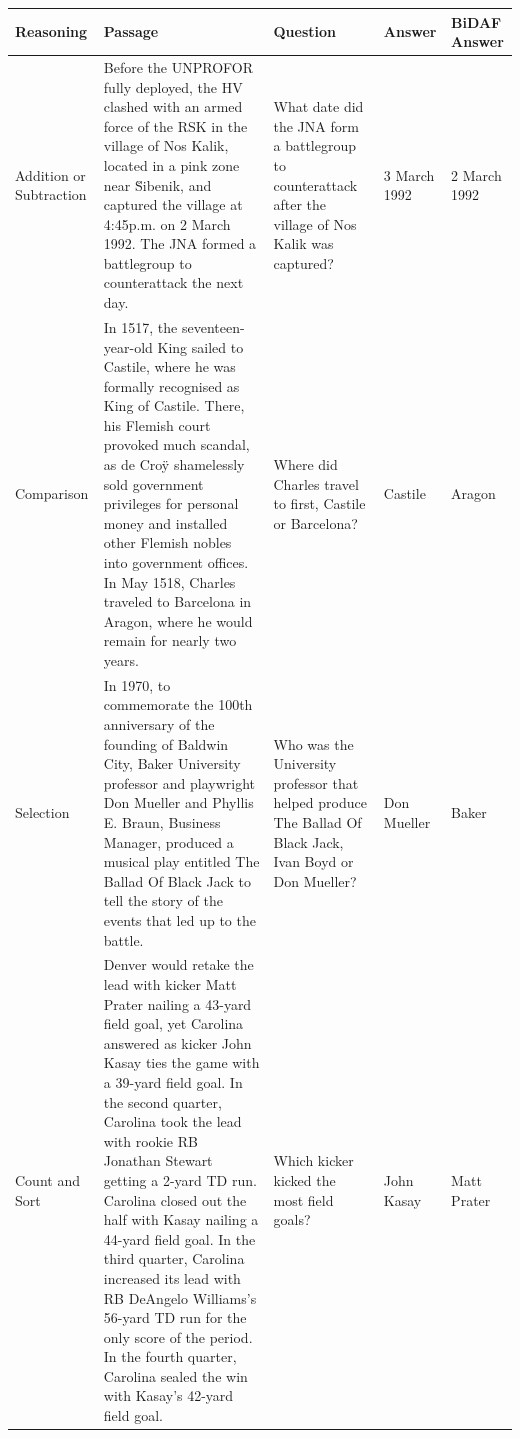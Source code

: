 \begin{table}[t]
\centering
\footnotesize
\begin{tabular}{|p{1.5cm}|p{8cm}|p{3cm}|p{1.25cm}|p{1.25cm}|}
\hline
Reasoning & Passage & Question & Answer & BiDAF Answer\\
 \hline
 Addition or Subtraction & Before the UNPROFOR fully deployed, the HV clashed with an armed force of the RSK in the village of Nos Kalik, located in a pink zone near \u Sibenik, and captured the village at 4:45p.m. on {\color{teal}2 March 1992}. The JNA formed a battlegroup to counterattack the {\color{teal}next day}. & What date did the JNA form a battlegroup to counterattack after the village of Nos Kalik was captured?  & 3 March 1992 & 2 March 1992 \\ 
 \hline
 Comparison & In {\color{orange}1517, the seventeen-year-old King sailed to Castile}, where he was formally recognised as King of Castile. There, his Flemish court provoked much scandal, as de Cro\"y shamelessly sold government privileges for personal money and installed other Flemish nobles into government offices. {\color{orange}In May 1518, Charles traveled to Barcelona in Aragon}, where he would remain for nearly two years. & Where did Charles travel to first, Castile or Barcelona? & Castile & Aragon\\
 \hline
 Selection & In 1970, to commemorate the 100th anniversary of the founding of Baldwin City, {\color{purple}Baker University professor and playwright Don Mueller and Phyllis E. Braun, Business Manager, produced a musical play entitled The Ballad Of Black Jack} to tell the story of the events that led up to the battle. & Who was the University professor that helped produce The Ballad Of Black Jack, Ivan Boyd or Don Mueller? & Don Mueller & Baker\\
 \hline
 Count and Sort & Denver would retake the lead with kicker {\color{brown}Matt Prater nailing a 43-yard field goal}, yet Carolina answered as kicker {\color{brown}John Kasay ties the game with a 39-yard field goal}. In the second quarter, Carolina took the lead with rookie RB Jonathan Stewart getting a 2-yard TD run. Carolina closed out the half with {\color{brown}Kasay nailing a 44-yard field goal}. In the third quarter, Carolina increased its lead with RB DeAngelo Williams's 56-yard TD run for the only score of the period. In the fourth quarter, Carolina sealed the win with {\color{brown}Kasay's 42-yard field goal}. & Which kicker kicked the most field goals? & John Kasay & Matt Prater\\

\end{tabular}
\end{table}
